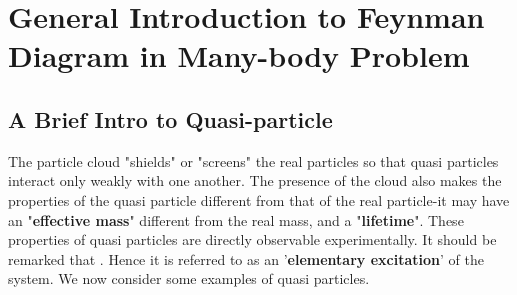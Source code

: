 \section{General Introduction to Feynman Diagram in Many-body Problem}
\subsection{A Brief Intro to Quasi-particle}

The particle cloud "shields" or "screens" the real particles so that quasi particles interact only weakly with one another. The presence of the cloud also makes the properties of the quasi particle different from that of the real particle-it may have an "\textbf{effective mass}" different from the real mass, and a "\textbf{lifetime}". These properties of quasi particles are directly observable experimentally. It should be remarked that . Hence it is referred to as an '\textbf{elementary excitation}' of the system. We now consider some examples of quasi particles.

